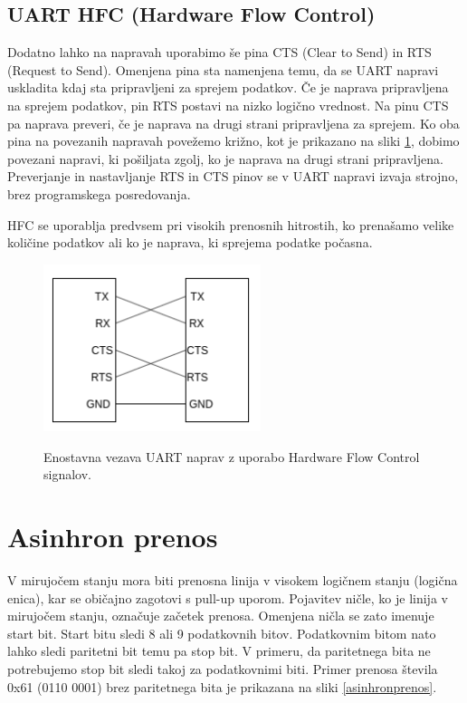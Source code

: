 \documentclass[12pt,letterpaper]{article}
\begin{document}
\subsection*{UART HFC (Hardware Flow Control)}

Dodatno lahko na napravah uporabimo še pina CTS (Clear to Send) in RTS (Request to Send). Omenjena pina sta namenjena temu, da se UART napravi uskladita kdaj sta pripravljeni za sprejem podatkov. Če je naprava pripravljena na sprejem podatkov, pin RTS postavi na nizko logično vrednost. Na pinu CTS pa naprava preveri, če je naprava na drugi strani pripravljena za sprejem. Ko oba pina na povezanih napravah povežemo križno, kot je prikazano na sliki \ref{uartctsrts}, dobimo povezani napravi, ki pošiljata zgolj, ko je naprava na drugi strani pripravljena. Preverjanje in nastavljanje RTS in CTS pinov se v UART napravi izvaja strojno, brez programskega posredovanja.

HFC se uporablja predvsem pri visokih prenosnih hitrostih, ko prenašamo velike količine podatkov ali ko je naprava, ki sprejema podatke počasna.

\begin{figure}[ht!]
  \centering
  \caption{Enostavna vezava UART naprav z uporabo Hardware Flow Control signalov.}
  \includegraphics[width=180pt]{images/vaja8/uart_cts_rts.png}
  \label{uartctsrts}
\end{figure}


\section*{Asinhron prenos}

V mirujočem stanju mora biti prenosna linija v visokem logičnem stanju (logična enica), kar se običajno zagotovi s pull-up uporom. Pojavitev ničle, ko je linija v mirujočem stanju, označuje začetek prenosa. Omenjena ničla se zato imenuje start bit. Start bitu sledi 8 ali 9 podatkovnih bitov. Podatkovnim bitom nato lahko sledi paritetni bit temu pa stop bit. V primeru, da paritetnega bita ne potrebujemo stop bit sledi takoj za podatkovnimi biti. Primer prenosa števila 0x61 (0110 0001) brez paritetnega bita je prikazana na sliki \ref{asinhronprenos}.
\end{document}
